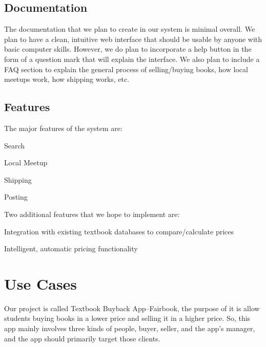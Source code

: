 \documentclass[12pt]{article}
\begin{document}
		\subsection{Documentation}
The documentation that we plan to create in our system is minimal overall. We plan to have a clean, intuitive web interface that should be usable by anyone with basic computer skills. However, we do plan to incorporate a help button in the form of a question mark that will explain the interface. We also plan to include a FAQ section to explain the general process of selling/buying books, how local meetups work, how shipping works, etc.
		\subsection{Features}

The major features of the system are:

Search \par
Local Meetup \par
Shipping \par
Posting \par

Two additional features that we hope to implement are:

Integration with existing textbook databases to compare/calculate prices \par
Intelligent, automatic pricing functionality


	\section{Use Cases}
Our project is called Textbook Buyback App--Fairbook, the purpose of it is allow students buying books in a lower price and selling it in a higher price. So, this app mainly involves three kinds of people, buyer, seller, and the app’s manager, and the app should primarily target those clients.
\end{document}
